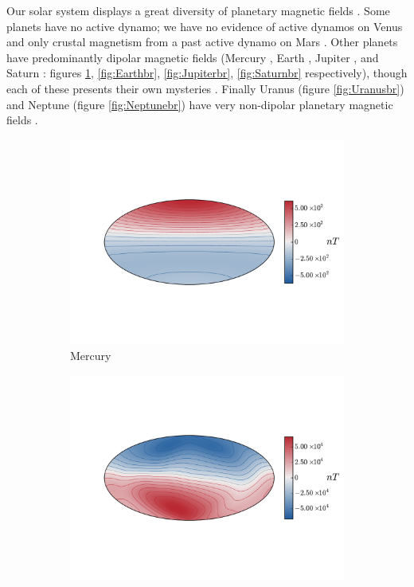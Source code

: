 Our solar system displays a great diversity of planetary magnetic fields \citep{connerney2007}. Some planets have no active dynamo; we have no evidence of active dynamos on Venus \citep{smith1963, smith1965} and only crustal magnetism from a past active dynamo on Mars \citep{acuna1999}. Other planets have predominantly dipolar magnetic fields (Mercury \citep{anderson2012}, Earth \citep{igrf11}, Jupiter \citep{connerney1992}, and Saturn \citep{cao2011}: figures \ref{fig:Mercurybrintro}, \ref{fig:Earthbr}, \ref{fig:Jupiterbr}, \ref{fig:Saturnbr} respectively), though each of these presents their own mysteries \citep{stevenson2003}. Finally Uranus (figure \ref{fig:Uranusbr}) and Neptune (figure \ref{fig:Neptunebr}) have very non-dipolar planetary magnetic fields \citep{holme1996}.  
\begin{figure}
	\centering
	 \begin{subfigure}[b]{0.47\textwidth}
                \includegraphics[width=\textwidth]{Chapter1/Figures/Mercury.pdf}
                \caption{Mercury \citep{anderson2012}}
                \label{fig:Mercurybrintro}
        \end{subfigure}
        	 \begin{subfigure}[b]{0.47\textwidth}
                \includegraphics[width=\textwidth]{Chapter1/Figures/Earth.pdf}

\end{subfigure}
\end{figure}
